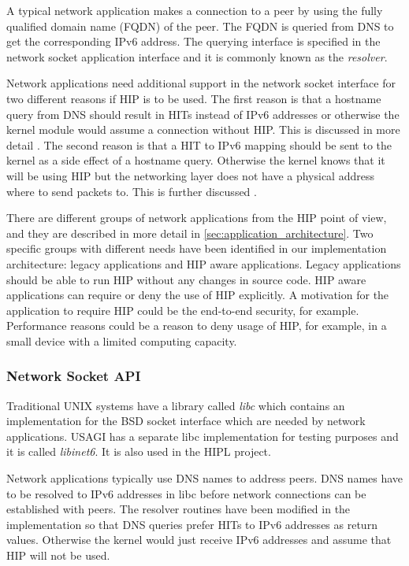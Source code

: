 A typical network application makes a connection to a peer by using
the fully qualified domain name (FQDN) of the peer. The FQDN is
queried from DNS to get the corresponding IPv6 address. The querying
interface is specified in the network socket application interface and
it is commonly known as the \textit{resolver}.

Network applications need additional support in the network socket
interface for two different reasons if HIP is to be used. The first
reason is that a hostname query from DNS should result in HITs instead
of IPv6 addresses or otherwise the kernel module would assume a
connection without HIP. This is discussed in more detail
. The second reason is that a HIT
to IPv6 mapping should be sent to the kernel as a side effect of a
hostname query. Otherwise the kernel knows that it will be using HIP
but the networking layer does not have a physical address where to
send packets to. This is further discussed
.

There are different groups of network applications from the HIP point
of view, and they are described in more detail in
\autoref{sec:application_architecture}. Two specific groups with
different needs have been identified in our implementation
architecture: legacy applications and HIP aware applications. Legacy
applications should be able to run HIP without any changes in source
code. HIP aware applications can require or deny the use of HIP
explicitly. A motivation for the application to require HIP could be
the end-to-end security, for example. Performance reasons could be a
reason to deny usage of HIP, for example, in a small device with a
limited computing capacity.

\subsubsection{Network Socket API}
\label{sec:api_architecture}


Traditional UNIX systems have a library called \textit{libc} which
contains an implementation for the BSD socket interface \cite{stevens}
which are needed by network applications. USAGI has a separate libc
implementation for testing purposes and it is called
\textit{libinet6}. It is also used in the HIPL project.

Network applications typically use DNS names to address peers. DNS
names have to be resolved to IPv6 addresses in libc before network
connections can be established with peers. The resolver routines have
been modified in the implementation so that DNS queries prefer HITs to
IPv6 addresses as return values. Otherwise the kernel would just
receive IPv6 addresses and assume that HIP will not be used.

